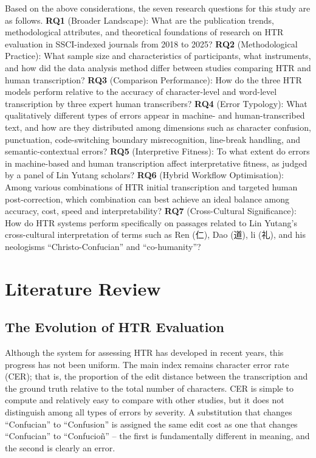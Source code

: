 \documentclass[final]{anthology-ch} %
\begin{document}
Based on the above considerations, the seven research questions for this study are as follows. \textbf{RQ1} (Broader Landscape): What are the publication trends, methodological attributes, and theoretical foundations of research on HTR evaluation in SSCI-indexed journals from 2018 to 2025? \textbf{RQ2} (Methodological Practice): What sample size and characteristics of participants, what instruments, and how did the data analysis method differ between studies comparing HTR and human transcription? \textbf{RQ3} (Comparison Performance): How do the three HTR models perform relative to the accuracy of character-level and word-level transcription by three expert human transcribers? \textbf{RQ4} (Error Typology): What qualitatively different types of errors appear in machine- and human-transcribed text, and how are they distributed among dimensions such as character confusion, punctuation, code-switching boundary misrecognition, line-break handling, and semantic-contextual errors? \textbf{RQ5} (Interpretive Fitness): To what extent do errors in machine-based and human transcription affect interpretative fitness, as judged by a panel of Lin Yutang scholars? \textbf{RQ6} (Hybrid Workflow Optimisation): Among various combinations of HTR initial transcription and targeted human post-correction, which combination can best achieve an ideal balance among accuracy, cost, speed and interpretability? \textbf{RQ7} (Cross-Cultural Significance): How do HTR systems perform specifically on passages related to Lin Yutang's cross-cultural interpretation of terms such as Ren (仁), Dao (道), li (礼), and his neologisms \enquote{Christo-Confucian} and \enquote{co-humanity}?

\section{Literature Review} \label{sec:litreview}

\subsection{The Evolution of HTR Evaluation}

Although the system for assessing HTR has developed in recent years, this progress has not been uniform. The main index remains character error rate (CER); that is, the proportion of the edit distance between the transcription and the ground truth relative to the total number of characters. CER is simple to compute and relatively easy to compare with other studies, but it does not distinguish among all types of errors by severity. A substitution that changes \enquote{Confucian} to \enquote{Confusion} is assigned the same edit cost as one that changes \enquote{Confucian} to \enquote{Confucioñ} -- the first is fundamentally different in meaning, and the second is clearly an error.
\end{document}
